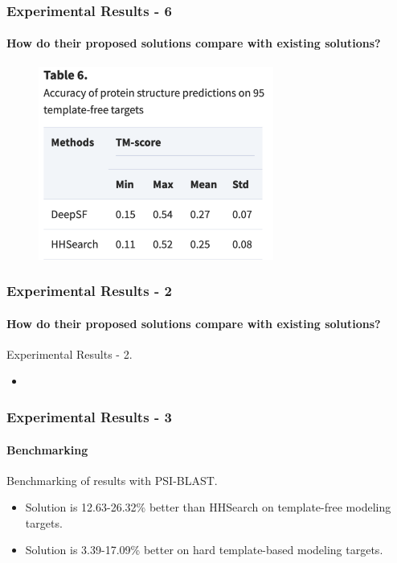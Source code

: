 \documentclass[xcolor={usenames,dvipsnames},hyperref={hyperindex,bookmarks}]{beamer}
\begin{document}
\frame
{
	\frametitle{Experimental Results - 6}
	\framesubtitle{How do their proposed solutions compare with existing solutions?}


	\begin{figure}[h]
	\centering 
	\includegraphics[height=2.5in]{./pics/table-6}
	\label{fig:Table6}
	\end{figure}
}



























\frame
{
	\frametitle{Experimental Results - 2}
	\framesubtitle{How do their proposed solutions compare with existing solutions?}

	Experimental Results - 2.
	\begin{itemize}
	\item 
	\end{itemize}

}









\frame
{
	\frametitle{Experimental Results - 3}
	\framesubtitle{Benchmarking}

	Benchmarking of results with PSI-BLAST.
	\begin{itemize}
	\item Solution is 12.63-26.32\% better than HHSearch on template-free modeling targets.
	\item Solution is 3.39-17.09\% better on hard template-based modeling targets.
	\end{itemize}

}
\end{document}
